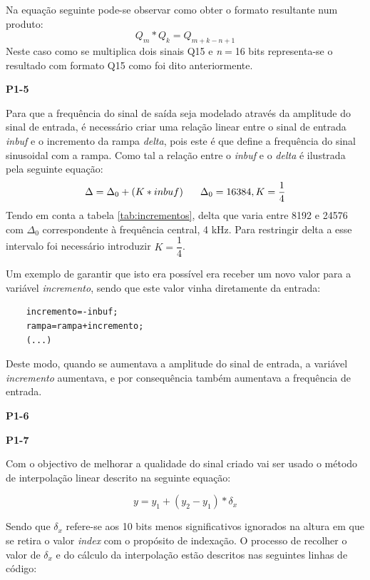 \documentclass[11pt]{article}
\begin{document}
Na equação seguinte pode-se observar como obter o formato resultante num produto:
\begin{equation}
Q_{m} * Q_{k}=Q_{m+k-n+1}
\end{equation}
Neste caso como se multiplica dois sinais Q15 e \textit{n}$=$16 bits representa-se o resultado com formato Q15 como foi dito anteriormente. 
\vspace{2 mm}

\textbf{P1-5}
\label{para:P1-5}

Para que a frequência do sinal de saída seja modelado através da amplitude do sinal de entrada, é necessário criar uma relação linear entre o sinal de entrada \textit{inbuf} e o incremento da rampa \textit{delta}, pois este é que define a frequência do sinal sinusoidal com a rampa. Como tal a relação entre o \textit{inbuf} e o \textit{delta} é ilustrada pela seguinte equação:
\begin{equation}
	\Delta=\Delta_0+(K*inbuf)	\hspace{6 mm}\Delta_0=16384, K=\frac{1}{4}
\end{equation}
Tendo em conta a tabela \ref{tab:incrementos}, delta que varia entre 8192 e 24576 com $\Delta_0$ correspondente à frequência central, 4 kHz. Para restringir delta a esse intervalo foi necessário introduzir $K=\dfrac{1}{4}$.

Um exemplo de garantir que isto era possível era receber um novo valor para a variável \textit{incremento}, sendo que este valor vinha diretamente da entrada:

\begin{lstlisting}
	incremento=-inbuf;
	rampa=rampa+incremento;
	(...)
\end{lstlisting}

Deste modo, quando se aumentava a amplitude do sinal de entrada, a variável \textit{incremento} aumentava, e por consequência também aumentava a frequência de entrada.

\textbf{P1-6}
\label{para:P1-6}

\textbf{P1-7}
\label{para:P1-7}

Com o objectivo de melhorar a qualidade do sinal criado vai ser usado o método de interpolação linear descrito na seguinte equação:

\begin{equation}
y=y_{1}+(y_{2}-y_{1})*\delta_{x}
\end{equation}

Sendo que $ \delta_{x} $ refere-se aos 10 bits menos significativos ignorados na altura em que se retira o valor \textit{index} com o propósito de indexação. O processo de recolher o valor de $ \delta_{x} $ e do cálculo da interpolação estão descritos nas seguintes linhas de código:
\end{document}
